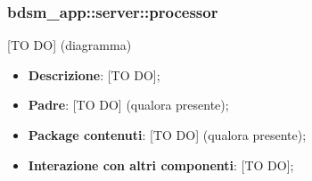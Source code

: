 


\subsubsection{bdsm\_app::server::processor} %
\label{ssub:bdsm_app_server_processor}
[TO DO] (diagramma) \newline \newline

\begin{itemize}
  \item \textbf{Descrizione}: [TO DO];
  \item \textbf{Padre}: [TO DO] (qualora presente);
  \item \textbf{Package contenuti}: [TO DO] (qualora presente);
  \item \textbf{Interazione con altri componenti}: [TO DO];
\end{itemize}
